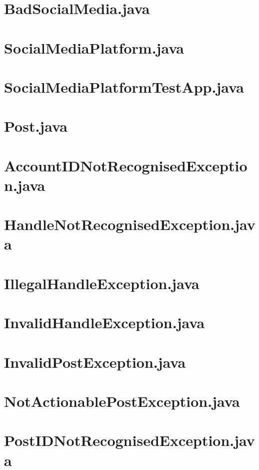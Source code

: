 \documentclass{article}
\begin{document}
\section{BadSocialMedia.java}


\section{SocialMediaPlatform.java}


\section{SocialMediaPlatformTestApp.java}


\section{Post.java}


\section{AccountIDNotRecognisedException.java}


\section{HandleNotRecognisedException.java}


\section{IllegalHandleException.java}


\section{InvalidHandleException.java}


\section{InvalidPostException.java}


\section{NotActionablePostException.java}


\section{PostIDNotRecognisedException.java}

\end{document}
